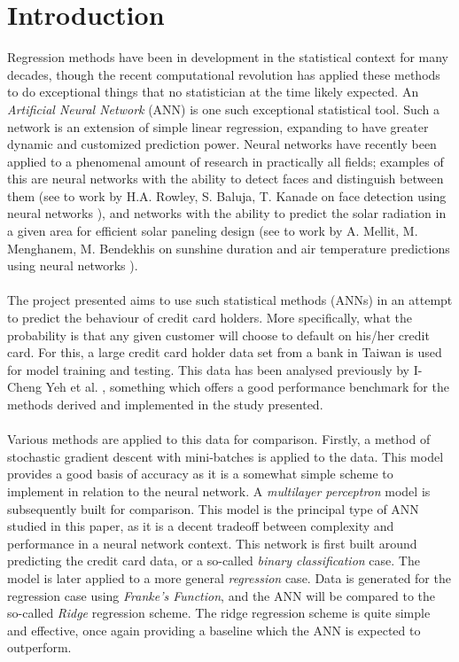 \section{Introduction}
    Regression methods have been in development in the statistical context for many decades, though the recent computational revolution has applied these methods to do exceptional things that no statistician at the time likely expected. An \textit{Artificial Neural Network} (ANN) is one such exceptional statistical tool. Such a network is an extension of simple linear regression, expanding to have greater dynamic and customized prediction power. Neural networks have recently been applied to a phenomenal amount of research in practically all fields; examples of this are neural networks with the ability to detect faces and distinguish between them (see to work by H.A. Rowley, S. Baluja, T. Kanade on face detection using neural networks \cite{NNWfacedetection}), and networks with the ability to predict the solar radiation in a given area for efficient solar paneling design (see to work by A. Mellit, M. Menghanem, M. Bendekhis on sunshine duration and air temperature predictions using neural networks \cite{NNWsunshine}). \\\\
    The project presented aims to use such statistical methods (ANNs) in an attempt to predict the behaviour of credit card holders. More specifically, what the probability is that any given customer will choose to default on his/her credit card. For this, a large credit card holder data set from a bank in Taiwan is used for model training and testing. This data has been analysed previously by I-Cheng Yeh et al. \cite{CCdata}, something which offers a good performance benchmark for the methods derived and implemented in the study presented. \\\\
    Various methods are applied to this data for comparison. Firstly, a method of stochastic gradient descent with mini-batches is applied to the data. This model provides a good basis of accuracy as it is a somewhat simple scheme to implement in relation to the neural network. A \textit{multilayer perceptron} model is subsequently built for comparison. This model is the principal type of ANN studied in this paper, as it is a decent tradeoff between complexity and performance in a neural network context. 
    This network is first built around predicting the credit card data, or a so-called \textit{binary classification} case. The model is later applied to a more general \textit{regression} case. Data is generated for the regression case using \textit{Franke's Function}, and the ANN will be compared to the so-called \textit{Ridge} regression scheme. The ridge regression scheme is quite simple and effective, once again providing a baseline which the ANN is expected to outperform.\\\\
